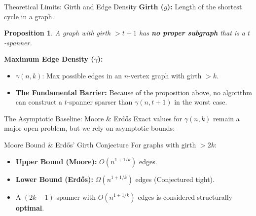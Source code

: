 \documentclass[10pt]{beamer}
\newtheorem{proposition}[theorem]{Proposition}
\begin{document}
\begin{frame}{Theoretical Limits: Girth and Edge Density}
    \textbf{Girth ($g$):} Length of the shortest cycle in a graph.
    
    \vspace{0.2cm}
    \begin{proposition}
        A graph with girth $> t + 1$ has \textbf{no proper subgraph} that is a $t$-spanner.
    \end{proposition}
    
    \vspace{0.4cm}
    \textbf{Maximum Edge Density ($\gamma$):}
    \begin{itemize}
        \item $\gamma(n,k)$: Max possible edges in an $n$-vertex graph with girth $> k$.
        \item \textbf{The Fundamental Barrier:} Because of the proposition above, no algorithm can construct a $t$-spanner sparser than $\gamma(n, t+1)$ in the worst case.
    \end{itemize}
\end{frame}

\begin{frame}{The Asymptotic Baseline: Moore \& Erdős}
    Exact values for $\gamma(n,k)$ remain a major open problem, but we rely on asymptotic bounds:
    
    \vspace{0.4cm}
    \begin{block}{Moore Bound \& Erdős' Girth Conjecture}
        For graphs with girth $> 2k$:
        \begin{itemize}
            \item \textbf{Upper Bound (Moore):} $O(n^{1+1/k})$ edges.
            \item \textbf{Lower Bound (Erdős):} $\Omega(n^{1+1/k})$ edges (Conjectured tight).
        \end{itemize}
    \end{block}
    
    \vspace{0.4cm}
    \begin{itemize}
        \item A $(2k-1)$-spanner with $O(n^{1+1/k})$ edges is considered structurally \textbf{optimal}.
    \end{itemize}
\end{frame}
\end{document}
